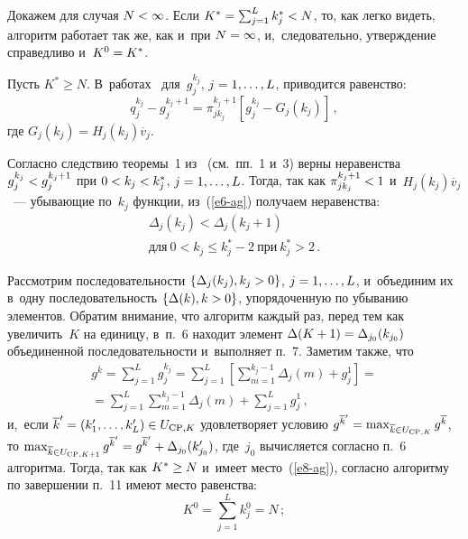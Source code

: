 \begin{multicols}{2}
  Докажем для случая $N\hm<\infty$. Если $K^*\hm= \sum\nolimits^L_{j=1} 
k_j^*\hm<N$, то, как легко видеть, алгоритм работает так же, как и~при 
$N\hm=\infty$, и,~следовательно, утверждение справедливо и~$K^0\hm=K^*$.
  
  Пусть $K^*\geq N$. В~работах~\cite{11-ag, 12-ag} для~$g_j^{k_j}$, 
$j\hm=1,\ldots ,L$, приводится равенство:
  \begin{equation}
  q_j^{k_j}-g_j^{k_j+1}=\pi_{jk_j}^{k_j+1} \left[ g_j^{k_j}-G_j(k_j)\right]\,,
  \label{e7-ag}
  \end{equation}
где $G_j(k_j)=H_j(k_j)\overline{v}_j$.

Согласно следствию теоремы~1 из~\cite{11-ag} (см.\ пп.~1 и~3) верны 
неравенства $g_j^{k_j}\hm< g_j^{k_j+1}$ при $0\hm< k_j\hm < k_j^*$, 
$j\hm=1,\ldots, L$. Тогда, так как $\pi_{jk_j}^{k_j+1}\hm<1$ 
и~$H_j(k_j)\overline{v}_j$~--- убывающие по~$k_j$ функции, из~(\ref{e6-ag}) 
получаем неравенства:
\begin{multline}
\Delta_j (k_j) <\Delta_j(k_j+1)\\
\mbox{для}\ 0<k_j\leq k_j^*-2\ \mbox{при}\ 
k_j^*>2\,.
\label{e8-ag}
\end{multline}

Рассмотрим последовательности $\{\Delta_j (k_j), k_j\hm>0\}$, $j\hm=1,\ldots ,L$, 
и~объединим их в~одну последовательность $\{ \Delta (k), k\hm>0\}$, 
упорядоченную по убыванию элементов. Обратим внимание, что алгоритм 
каждый раз, перед тем как увеличить~$K$ на единицу, в~п.~6 находит элемент 
$\Delta (K\hm+1)\hm= \Delta_{j_0} (k_{j_0})$ объединенной 
последовательности и~выполняет п.~7. Заметим также, что 
\begin{multline*}
g^{\overline{k}} 
= \sum\limits^L_{j=1} g_j^{k_j} = \sum\limits^L_{j=1} \left[ 
\sum\limits^{k_j-1}_{m=1} \Delta_j (m)+g_j^1\right] = {}\\
{}=
\sum\limits^L_{j=1} \sum\limits_{m=1}^{k_j-1} \Delta_j(m)+ 
\sum\limits^L_{j=1} g_j^1\,,
\end{multline*}
и,~если $\overline{k}^\prime\hm= (k^\prime_1, 
\ldots , k_L^\prime) \hm\in U_{\mathrm{CP},K}$ удовле\-тво\-ря\-ет условию 
$g^{\overline{k}^\prime}\hm= \max\nolimits_{\overline{k}\in U_{\mathrm{CP},K}} 
g^{\overline{k}}$, то $\max\nolimits_{\overline{k}\in U_{\mathrm{CP},K+1}} 
g^{\overline{k}^\prime}\hm= 
g^{\overline{k}^\prime} \hm+\Delta_{j_0}(k_{j_0}^\prime)$, где~$j_0$ 
вычисляется согласно п.~6 алгоритма. Тогда, так как $K^*\hm\geq N$ и~имеет 
место~(\ref{e8-ag}), согласно алгоритму по завершении п.~11 имеют место 
равенства:
$$
K^0= \sum\limits^L_{j=1} k_j^0 =N\,;
$$


\end{multicols}
